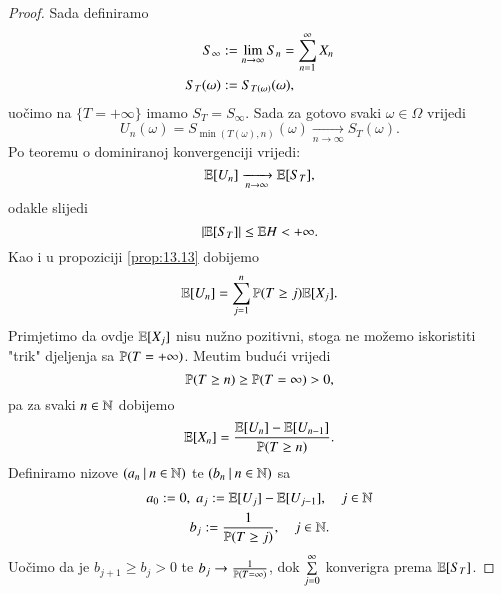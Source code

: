 \begin{proof}
    Sada definiramo
    \begin{equation*}
        \begin{aligned}
            S_{\infty} &:=\lim\limits_{n \to \infty} S_n = \sum\limits_{n = 1}^{\infty} X_n\\
            S_T (\omega) &:= S_{T (\omega)} (\omega),
        \end{aligned}
    \end{equation*}
    uo\v cimo na $\{T = +\infty\}$ imamo $S_T = S_\infty$.
    Sada za gotovo svaki $\omega \in \Omega$ vrijedi
    \begin{equation*}
        U_n (\omega) = S_{\min (T(\omega), n)} (\omega) \xrightarrow[n \to \infty]{} S_T (\omega).
    \end{equation*}
    Po teoremu o dominiranoj konvergenciji vrijedi:
    \begin{equation*}
        \mathbb{E} [U_n] \xrightarrow[n \to \infty]{} \mathbb{E} [S_T],
    \end{equation*}
    odakle slijedi
    \begin{equation*}
        | \mathbb{E} [S_T]| \leq \mathbb{E} H < +\infty.
    \end{equation*}
    Kao i u propoziciji \ref{prop:13.13} dobijemo
    \begin{equation*}
        \mathbb{E} [U_n] = \sum\limits_{j = 1}^{n} \mathbb{P}({T \geq j}) \mathbb{E} [X_j].
    \end{equation*}
    Primjetimo da ovdje $\mathbb{E} [X_j]$ nisu nu\v zno pozitivni, stoga ne mo\v zemo iskoristiti "trik" djeljenja sa $\mathbb{P}({T = +\infty})$.
    Me\dj utim budu\' ci vrijedi
    \begin{equation*}
        \mathbb{P} (T \geq n) \geq \mathbb{P}({T = \infty}) > 0,
    \end{equation*}
    pa za svaki $n \in \mathbb{N}$ dobijemo
    \begin{equation*}
        \mathbb{E} [ X_n ] = \frac{\mathbb{E} [ U_n ] - \mathbb{E} [U_{n - 1}]}{\mathbb{P}({T \geq n})}.
    \end{equation*}
    Definiramo nizove $({a_n} \: | \: {n \in \mathbb{N}})$ te $({b_n} \: | \: {n \in \mathbb{N}})$ sa
    \begin{equation*}
        \begin{gathered}
            a_0 := 0, \; a_j := \mathbb{E} [U_j] - \mathbb{E} [U_{j - 1}], \quad j \in \mathbb{N}\\
            b_j := \frac{1}{\mathbb{P}({T \geq j})}, \quad j \in \mathbb{N}.
        \end{gathered}
    \end{equation*}
    Uo\v cimo da je $b_{j + 1} \geq b_{j} > 0$ te $b_j \to \frac{1}{\mathbb{P}({T = \infty})}$, dok $\sum\limits_{j = 0}^{\infty}$ konverigra prema $\mathbb{E} [S_T]$.

\end{proof}
